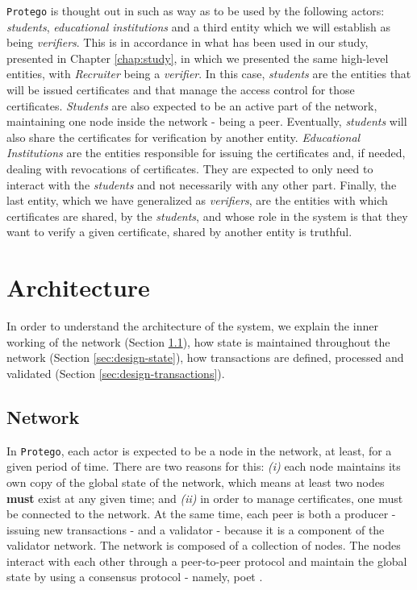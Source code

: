 \texttt{Protego} is thought out in such as way as to be used by the following actors: \textit{students}, \textit{educational institutions} and a third entity which we will establish as being \textit{verifiers}. This is in accordance in what has been used in our study, presented in Chapter \ref{chap:study}, in which we presented the same high-level entities, with \textit{Recruiter} being a \textit{verifier}. In this case, \textit{students} are the entities that will be issued certificates and that manage the access control for those certificates. \textit{Students} are also expected to be an active part of the network, maintaining one node inside the network - being a peer. Eventually, \textit{students} will also share the certificates for verification by another entity. \textit{Educational Institutions} are the entities responsible for issuing the certificates and, if needed, dealing with revocations of certificates. They are expected to only need to interact with the \textit{students} and not necessarily with any other part. Finally, the last entity, which we have generalized as \textit{verifiers}, are the entities with which certificates are shared, by the \textit{students}, and whose role in the system is that they want to verify a given certificate, shared by another entity is truthful.


\section{Architecture}
\label{sec:design-architecture}

In order to understand the architecture of the system, we explain the inner working of the network (Section \ref{sec:design-network}), how state is maintained throughout the network (Section \ref{sec:design-state}), how transactions are defined, processed and validated (Section \ref{sec:design-transactions}).

\subsection{Network}
\label{sec:design-network}

In \texttt{Protego}, each actor is expected to be a node in the network, at least, for a given period of time. There are two reasons for this: \emph{(i)} each node maintains its own copy of the global state of the network, which means at least two nodes \textbf{must} exist at any given time; and \emph{(ii)} in order to manage certificates, one must be connected to the network. At the same time, each peer is both a producer - issuing new transactions - and a validator - because it is a component of the validator network. The network is composed of a collection of nodes. The nodes interact with each other through a peer-to-peer protocol and maintain the global state by using a consensus protocol - namely, \gls{poet} \cite{intel_poet}.

